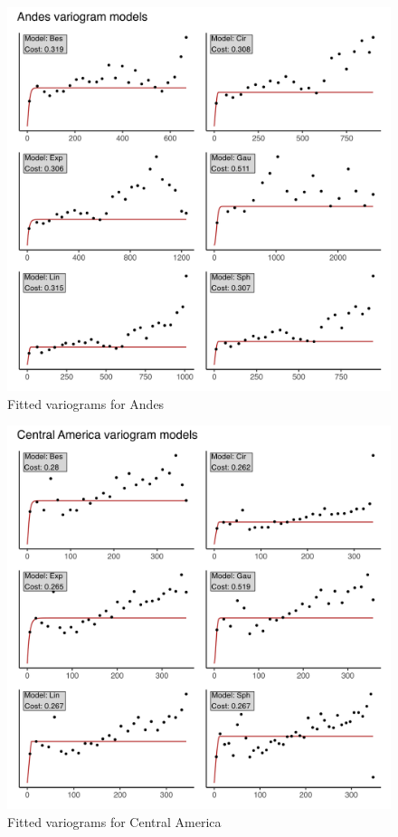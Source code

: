 \begin{figure}
\centering
\includegraphics{assets/figs/chpt3/AndesVgrms.png}
\caption[Fitted variograms for Andes]{Fitted variograms for Andes}
\end{figure}

\begin{figure}
\centering
\includegraphics{assets/figs/chpt3/CentralAmericaVgrms.png}
\caption[Fitted variograms for Central America]{Fitted variograms for Central America}
\end{figure}

